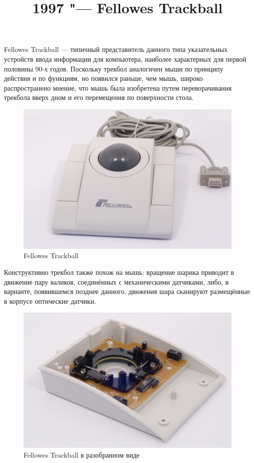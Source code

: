 \documentclass[11pt, a4paper]{article}
\begin{document}
\title{1997 "--- Fellowes Trackball}

\maketitle
Fellowes Trackball — типичный представитель данного типа указательных устройств ввода информации для компьютера, наиболее характерных для первой половины 90-х годов. Поскольку трекбол аналогичен мыши по принципу действия и по функциям, но появился раньше, чем мышь, широко распространено мнение, что мышь была изобретена путем переворачивания трекбола вверх дном и его перемещения по поверхности стола.

\begin{figure}[h]
    \centering
    \includegraphics[scale=0.2]{1997_fellowes_trackball/fellowes.jpg}
    \caption{Fellowes Trackball}
    \label{fig:pic}
\end{figure}

Конструктивно трекбол также похож на мышь: вращение шарика приводит в движение пару валиков, соединённых с механическими датчиками, либо, в варианте, появившемся позднее данного, движения шара сканируют размещённые в корпусе оптические датчики. 

\begin{figure}[h]
    \centering
    \includegraphics[scale=0.3]{1997_fellowes_trackball/fellowes2.jpg}
    \caption{Fellowes Trackball в разобранном виде}
    \label{fig:inside}
\end{figure}
\end{document}
